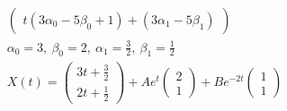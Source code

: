 \begin{gather*}
\begin{pmatrix}
		t(3\alpha_0 - 5\beta_0 + 1) + (3\alpha_1 - 5\beta_1)
	\end{pmatrix}\\
	\alpha_0 = 3,\ \beta_0 = 2,\ \alpha_1 = \frac{3}{2},\ \beta_1 = \frac{1}{2}\\
	X(t) = 
	\begin{pmatrix}
		3t + \frac{3}{2}\\
		2t + \frac{1}{2}
	\end{pmatrix}
	+
	A e^{t}
	\begin{pmatrix}
		2 \\ 1
	\end{pmatrix}
	+
	B e^{-2t}
	\begin{pmatrix}
		1 \\ 1
	\end{pmatrix}
	\end{gather*}
\vskip 0.4in


